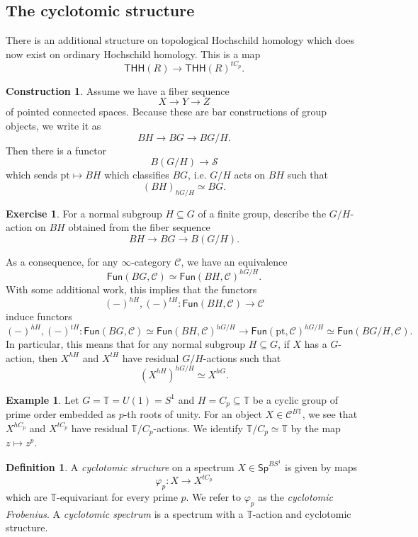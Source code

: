 \documentclass[10pt, oneside]{memoir}
\theoremstyle{definition}
\newtheorem{defn}[thm]{Definition}
\newtheorem{con}[thm]{Construction}
\newtheorem{exm}[thm]{Example}
\newtheorem{exer}[thm]{Exercise}
\theoremstyle{remark}
\theoremstyle{plain}
\theoremstyle{definition}
\theoremstyle{remark}
\newcommand{\mc}[1]{\mathcal{#1}}
\newcommand{\T}{\mathbb{T}}
\newcommand{\mr}[1]{\mathrm{#1}}
\newcommand{\ms}[1]{\mathsf{#1}}
\newcommand{\1}{\mathbf{1}}
\newcommand{\2}{\mathbf{2}}
\newcommand{\3}{\mathbf{3}}
\newcommand{\pt}{\mr{pt}}
\newcommand{\THH}{\ms{THH}}
\begin{document}
\subsection{The cyclotomic structure}%
\label{sub:The cyclotomic structure}

There is an additional structure on topological Hochschild homology which does now exist on ordinary Hochschild homology. This is a map
\[ \THH(R) \to \THH(R)^{tC_p}. \]

\begin{con}
    Assume we have a fiber sequence
    \[ X \to Y \to Z \]
    of pointed connected spaces. Because these are bar constructions of group objects, we write it as
    \[ BH \to BG \to BG/H. \]
    Then there is a functor
    \[ B(G/H) \to \mc{S} \]
    which sends $\pt \mapsto BH$ which classifies $BG$, i.e. $G/H$ acts on $BH$ such that
    \[ (BH)_{h G/H} \simeq BG. \]
\end{con}

\begin{exer}
    For a normal subgroup $H \subseteq G$ of a finite group, describe the $G/H$-action on $BH$ obtained from the fiber sequence
    \[ BH \to BG \to B(G/H). \]
\end{exer}

As a consequence, for any $\infty$-category $\mc{C}$, we have an equivalence
\[ \ms{Fun}(BG, \mc{C}) \simeq \ms{Fun}(BH, \mc{C})^{h G/H}. \]
With some additional work, this implies that the functors
\[ (-)^{hH}, (-)^{tH} \colon \ms{Fun}(BH, \mc{C}) \to \mc{C} \]
induce functors
\[ (-)^{hH}, (-)^{tH} \colon \ms{Fun}(BG, \mc{C}) \simeq \ms{Fun}(BH, \mc{C})^{hG/H} \to \ms{Fun}(\pt, \mc{C})^{hG/H} \simeq \ms{Fun}(BG/H, \mc{C}). \]
In particular, this means that for any normal subgroup $H \subseteq G$, if $X$ has a $G$-action, then $X^{hH}$ and $X^{tH}$ have residual $G/H$-actions such that
\[ (X^{hH})^{hG/H} \simeq X^{hG}. \]

\begin{exm}
    Let $G = \T = U(1) = S^1$ and $H = C_p \subseteq \T$ be a cyclic group of prime order embedded as $p$-th roots of unity. For an object $X \in \mc{C}^{B\T}$, we see that $X^{hC_p}$ and $X^{tC_p}$ have residual $\T/C_p$-actions. We identify $\T/C_p \simeq \T$ by the map $z \mapsto z^p$.
\end{exm}

\begin{defn}
    A \textit{cyclotomic structure} on a spectrum $X \in \ms{Sp}^{BS^1}$ is given by maps
    \[ \varphi_p \colon X \to X^{tC_p} \]
    which are $\T$-equivariant for every prime $p$. We refer to $\varphi_p$ as the \textit{cyclotomic Frobenius}. A \textit{cyclotomic spectrum} is a spectrum with a $\T$-action and cyclotomic structure.
\end{defn}
\end{document}
